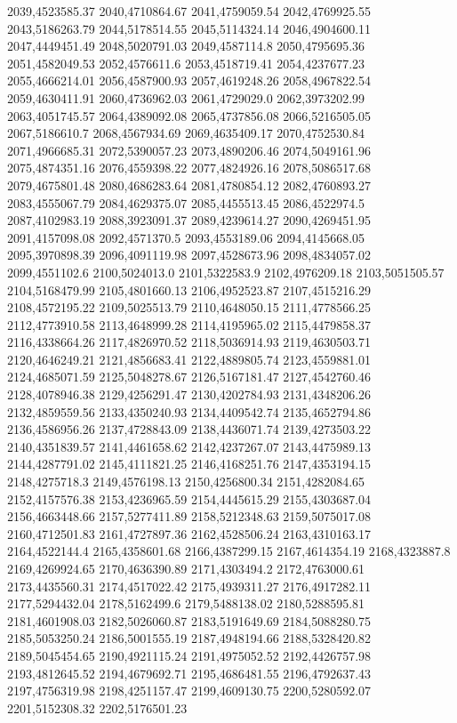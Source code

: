 2039,4523585.37
2040,4710864.67
2041,4759059.54
2042,4769925.55
2043,5186263.79
2044,5178514.55
2045,5114324.14
2046,4904600.11
2047,4449451.49
2048,5020791.03
2049,4587114.8
2050,4795695.36
2051,4582049.53
2052,4576611.6
2053,4518719.41
2054,4237677.23
2055,4666214.01
2056,4587900.93
2057,4619248.26
2058,4967822.54
2059,4630411.91
2060,4736962.03
2061,4729029.0
2062,3973202.99
2063,4051745.57
2064,4389092.08
2065,4737856.08
2066,5216505.05
2067,5186610.7
2068,4567934.69
2069,4635409.17
2070,4752530.84
2071,4966685.31
2072,5390057.23
2073,4890206.46
2074,5049161.96
2075,4874351.16
2076,4559398.22
2077,4824926.16
2078,5086517.68
2079,4675801.48
2080,4686283.64
2081,4780854.12
2082,4760893.27
2083,4555067.79
2084,4629375.07
2085,4455513.45
2086,4522974.5
2087,4102983.19
2088,3923091.37
2089,4239614.27
2090,4269451.95
2091,4157098.08
2092,4571370.5
2093,4553189.06
2094,4145668.05
2095,3970898.39
2096,4091119.98
2097,4528673.96
2098,4834057.02
2099,4551102.6
2100,5024013.0
2101,5322583.9
2102,4976209.18
2103,5051505.57
2104,5168479.99
2105,4801660.13
2106,4952523.87
2107,4515216.29
2108,4572195.22
2109,5025513.79
2110,4648050.15
2111,4778566.25
2112,4773910.58
2113,4648999.28
2114,4195965.02
2115,4479858.37
2116,4338664.26
2117,4826970.52
2118,5036914.93
2119,4630503.71
2120,4646249.21
2121,4856683.41
2122,4889805.74
2123,4559881.01
2124,4685071.59
2125,5048278.67
2126,5167181.47
2127,4542760.46
2128,4078946.38
2129,4256291.47
2130,4202784.93
2131,4348206.26
2132,4859559.56
2133,4350240.93
2134,4409542.74
2135,4652794.86
2136,4586956.26
2137,4728843.09
2138,4436071.74
2139,4273503.22
2140,4351839.57
2141,4461658.62
2142,4237267.07
2143,4475989.13
2144,4287791.02
2145,4111821.25
2146,4168251.76
2147,4353194.15
2148,4275718.3
2149,4576198.13
2150,4256800.34
2151,4282084.65
2152,4157576.38
2153,4236965.59
2154,4445615.29
2155,4303687.04
2156,4663448.66
2157,5277411.89
2158,5212348.63
2159,5075017.08
2160,4712501.83
2161,4727897.36
2162,4528506.24
2163,4310163.17
2164,4522144.4
2165,4358601.68
2166,4387299.15
2167,4614354.19
2168,4323887.8
2169,4269924.65
2170,4636390.89
2171,4303494.2
2172,4763000.61
2173,4435560.31
2174,4517022.42
2175,4939311.27
2176,4917282.11
2177,5294432.04
2178,5162499.6
2179,5488138.02
2180,5288595.81
2181,4601908.03
2182,5026060.87
2183,5191649.69
2184,5088280.75
2185,5053250.24
2186,5001555.19
2187,4948194.66
2188,5328420.82
2189,5045454.65
2190,4921115.24
2191,4975052.52
2192,4426757.98
2193,4812645.52
2194,4679692.71
2195,4686481.55
2196,4792637.43
2197,4756319.98
2198,4251157.47
2199,4609130.75
2200,5280592.07
2201,5152308.32
2202,5176501.23
